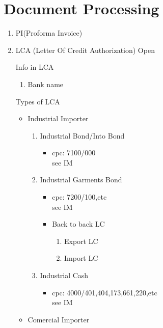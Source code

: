 \documentclass[10pt]{article}
\begin{document}
\section{Document Processing}\label{Doc Pros}
\begin{enumerate}
    \item PI(Proforma Invoice)
    \item LCA (Letter Of Credit Authorization) Open
\begin{description}
    \item [Info in LCA]
\end{description}
\begin{enumerate}
    \item Bank name
\end{enumerate}
\begin{description}
    \item [Types of LCA]
\end{description}
\begin{itemize}
        \item Industrial Importer
\begin{enumerate}
        \item Industrial Bond/Into Bond
\begin{itemize}
        \item cpc: 7100/000
            \\ see IM
\end{itemize}
        \item Industrial Garments Bond 
\begin{itemize}
        \item cpc: 7200/100,etc
            \\ see IM
        \item Back to back LC
\begin{enumerate}
            \item Export LC
            \item Import LC
\end{enumerate}
\end{itemize}
        \item Industrial Cash
\begin{itemize}
        \item cpc: 4000/401,404,173,661,220,etc
            \\ see IM
\end{itemize}
\end{enumerate}
        \item Comercial Importer
\begin{itemize}

\end{itemize}
\end{itemize}
\end{enumerate}
\end{document}
